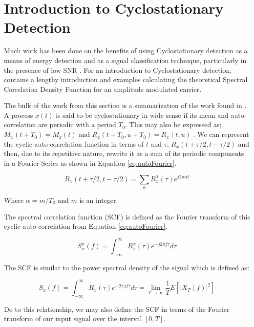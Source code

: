 \section{Introduction to Cyclostationary Detection}
\label{sec:cycloIntro}
Much work has been done on the benefits of using Cyclostationary detection as a
means of energy detection and as a signal classification
technique, particularly in the presence of low SNR \cite{kim2007}.  For an
introduction to Cyclostationary detection, \cite{costa1996} contains a lengthy
introduction and examples calculating the theoretical Spectral Correlation Density Function for
an amplitude modulated carrier.

The bulk of the work from this section is a summarization of the work found in
\cite{kim2007}.  A process $x(t)$ is said to be cyclostationary in wide sense
if its mean and auto-correlation are periodic with a period $T_0$.  This may also be expressed as; $M_x(t+T_0) = M_x(t)$ and $R_x(t+T_0, u + T_0) = R_x(t,u)$ \cite{kim2007}. 
We can represent the cyclic auto-correlation function in terms of $t$ and
$\tau$; $R_x(t+\tau/2, t-\tau/2)$ and then, due to its repetitive nature,
rewrite it as a sum of its periodic components in a Fourier Series as shown in
Equation \ref{eq:autoFourier}.

\begin{equation}
R_x(t+\tau/2, t- \tau/2) = \sum_{\alpha} R_x^{\alpha}(\tau)e^{j2\pi \alpha t}
\label{eq:autoFourier}
\end{equation}

Where $\alpha = m/T_0$ and $m$ is an integer. 

The spectral correlation function (SCF) is defined as the Fourier transform of
this cyclic auto-correlation from Equation \ref{eq:autoFourier}.

\begin{equation}
S_x^{\alpha}(f) = \int_{-\infty}^{\infty} R_x^{\alpha}(\tau)e^{-j2\pi f \tau} d\tau
\label{eq:ScdDefined}
\end{equation}

The SCF is similar to the power spectral density of the signal which is defined
as: 

\begin{equation}
S_x(f) = \int_{-\infty}^{\infty} R_x(\tau)e^{-2\pi j f \tau} d\tau = \lim_{T \to \infty} \frac{1}{T}E[|X_T(f)|^2]
\label{eq:PSDDef}
\end{equation}


Do to this relationship, we may also define the SCF in terms of the Fourier
transform of our input signal over the interval $[0, T]$.

